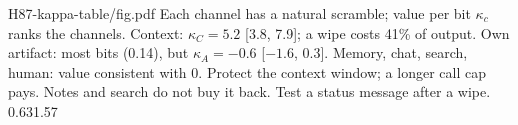 {H87-kappa-table/fig.pdf}
{Each channel has a natural scramble; value per bit $\kappa_c$ ranks the channels.}
{Context: $\kappa_C=5.2$ [3.8, 7.9]; a wipe costs 41\% of output. Own artifact: most bits (0.14), but $\kappa_A=-0.6$ [$-1.6$, 0.3]. Memory, chat, search, human: value consistent with 0.}
{Protect the context window; a longer call cap pays. Notes and search do not buy it back. Test a status message after a wipe.}
{0.63}{1.57}
